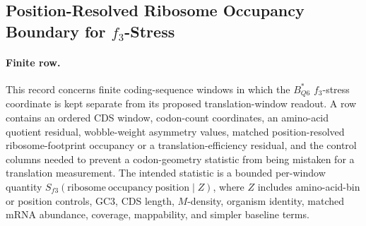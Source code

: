 \subsection{Position-Resolved Ribosome Occupancy Boundary for $f_3$-Stress}
\label{sec:q6-f3-stress-position-resolved-ribosome-occupancy-translation-window-cross-layer}

\paragraph{Finite row.}
This record concerns finite coding-sequence windows in which the $B^{*}_{Q6}$ $f_3$-stress coordinate is kept separate from its proposed translation-window readout.  A row contains an ordered CDS window, codon-count coordinates, an amino-acid quotient residual, wobble-weight asymmetry values, matched position-resolved ribosome-footprint occupancy or a translation-efficiency residual, and the control columns needed to prevent a codon-geometry statistic from being mistaken for a translation measurement.  The intended statistic is a bounded per-window quantity $S_{f3}(\mathrm{ribosome\ occupancy\ position}\mid Z)$, where $Z$ includes amino-acid-bin or position controls, GC3, CDS length, $M$-density, organism identity, matched mRNA abundance, coverage, mappability, and simpler baseline terms.

